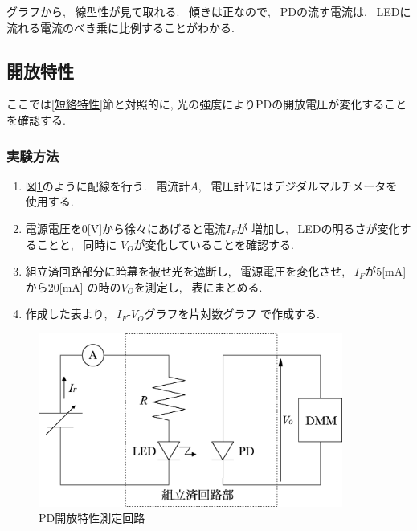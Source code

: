 \documentclass[titlepage]{jsarticle}
\begin{document}
            グラフから, ~線型性が見て取れる. ~傾きは正なので,
            ~PDの流す電流は, ~LEDに流れる電流のべき乗に比例することがわかる.

    \subsection{開放特性}
        ここでは\ref{短絡特性}節と対照的に,
        光の強度によりPDの開放電圧が変化することを確認する.
            
        \subsubsection{実験方法}
            \begin{enumerate}
                \item 図\ref{fig:開放特性回路}のように配線を行う.
                    ~電流計$A$, ~電圧計$V$にはデジダルマルチメータを
                    使用する.
                \item 電源電圧を0[V]から徐々にあげると電流$I_F$が
                    増加し, ~LEDの明るさが変化することと, ~同時に
                    $V_O$が変化していることを確認する.
                \item 組立済回路部分に暗幕を被せ光を遮断し,
                    ~電源電圧を変化させ, ~$I_F$が5[mA]から20[mA]
                    の時の$V_O$を測定し, ~表にまとめる.
                \item 作成した表より, ~$I_F$-$V_O$グラフを片対数グラフ
                    で作成する.
            \end{enumerate}

            \begin{figure}[ht]
                \centering
                \includegraphics[width=10cm]{images/kaihou.eps}
                \caption{PD開放特性測定回路}
                \label{fig:開放特性回路}
            \end{figure}
            
\end{document}
